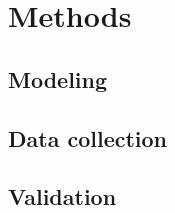 \documentclass[float=false, crop=false]{standalone}
\begin{document}
\section{Methods}\label{sec:methods}
\Blindtext[3][2] %
\subsection{Modeling}\label{sec:model}
\Blindtext[1][2]
\subsection{Data collection}\label{sec:datacollect}
\Blindtext[1][2]
\subsection{Validation}\label{sec:validation}
\Blindtext[1][2]
\end{document}
